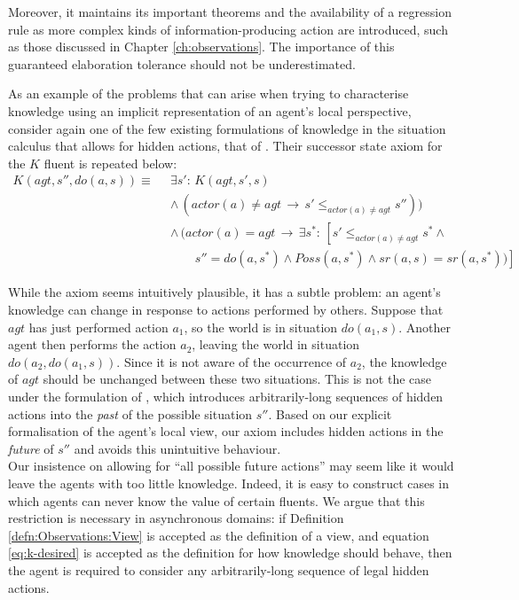 Moreover, it maintains its important theorems and the availability
of a regression rule as more complex kinds of information-producing
action are introduced, such as those discussed in Chapter \ref{ch:observations}.
The importance of this guaranteed elaboration tolerance should not
be underestimated.

As an example of the problems that can arise when trying to characterise
knowledge using an implicit representation of an agent's local perspective,
consider again one of the few existing formulations of knowledge in
the situation calculus that allows for hidden actions, that of \citep{Lesperance99sitcalc_approach}.
Their successor state axiom for the $K$ fluent is repeated below:\begin{align*}
K(agt,s'',do(a,s))\equiv\,\,\, & \exists s':\, K(agt,s',s)\\
 & \wedge\,(actor(a)\neq agt\,\rightarrow\, s'\leq_{actor(a)\neq agt}s''))\\
 & \wedge\,(actor(a)=agt\,\rightarrow\,\exists s^{*}:\,\left[s'\leq_{actor(a)\neq agt}s^{*}\wedge\right.\\
 & \,\,\,\,\,\,\,\,\,\,\,\,\left.s''=do(a,s^{*})\wedge Poss(a,s^{*})\wedge sr(a,s)=sr(a,s^{*}))\right]\end{align*}


While the axiom seems intuitively plausible, it has a subtle problem:
an agent's knowledge can change in response to actions performed by
others. Suppose that $agt$ has just performed action $a_{1}$, so
the world is in situation $do(a_{1},s)$. Another agent then performs
the action $a_{2}$, leaving the world in situation $do(a_{2},do(a_{1},s))$.
Since it is not aware of the occurrence of $a_{2}$, the knowledge
of $agt$ should be unchanged between these two situations. This is
not the case under the formulation of \citep{Lesperance99sitcalc_approach},
which introduces arbitrarily-long sequences of hidden actions into
the \emph{past} of the possible situation $s''$. Based on our explicit
formalisation of the agent's local view, our axiom includes hidden
actions in the \emph{future} of $s''$ and avoids this unintuitive
behaviour.\\


Our insistence on allowing for {}``all possible future actions''
may seem like it would leave the agents with too little knowledge.
Indeed, it is easy to construct cases in which agents can never know
the value of certain fluents. We argue that this restriction is necessary
in asynchronous domains: if Definition \ref{defn:Observations:View}
is accepted as the definition of a view, and equation \eqref{eq:k-desired}
is accepted as the definition for how knowledge should behave, then
the agent is required to consider any arbitrarily-long sequence of
legal hidden actions.

